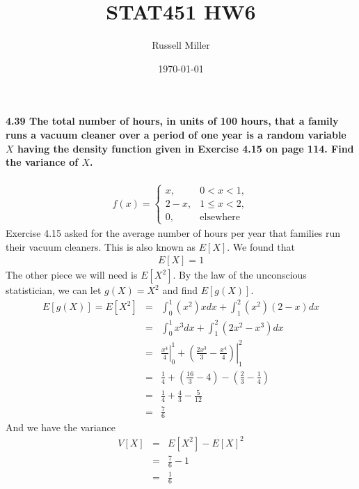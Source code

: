 \documentclass{article}
\title{STAT451 HW6}
\author{Russell Miller}
\date{\today}
\begin{document}
\maketitle


\paragraph{4.39 The total number of hours, in units of 100 hours, that a family 
runs a vacuum cleaner over a period of one year is a random variable $X$ having 
the density function given in Exercise 4.15 on page 114. Find the variance of 
$X$.}
\begin{eqnarray*}
f(x) = \left\{\begin{array}{ll}
	x,& 0<x<1,\\
	2-x,& 1\leq x<2,\\
	0,& \mbox{elsewhere}
	\end{array}\right.
\end{eqnarray*}
Exercise 4.15 asked for the average number of hours per year that families run 
their vacuum cleaners. This is also known as $E[X]$. We found that
\begin{eqnarray*}
E[X] = 1
\end{eqnarray*}
The other piece we will need is $E[X^2]$. By the law of the unconscious 
statistician, we can let $g(X)=X^2$ and find $E[g(X)]$.
\begin{eqnarray*}
E[g(X)]=E[X^2] & = & \int_0^1 (x^2)xdx + \int_1^2 (x^2)(2-x)dx\\
	& = & \int_0^1 x^3dx + \int_1^2 (2x^2-x^3)dx\\
	& = & \left.\frac{x^4}{4}\right|_0^1 + \left.\left(\frac{2x^3}{3}-
				\frac{x^4}{4}\right)\right|_1^2\\
	& = & \frac{1}{4}+\left(\frac{16}{3}-4\right)-
				\left(\frac{2}{3}-\frac{1}{4}\right)\\
	& = & \frac{1}{4}+\frac{4}{3}-\frac{5}{12}\\
	& = & \frac{7}{6}
\end{eqnarray*}
And we have the variance
\begin{eqnarray*}
V[X] & = & E[X^2]-E[X]^2\\
	& = & \frac{7}{6}-1\\
	& = & \boxed{\frac{1}{6}}
\end{eqnarray*}

\pagebreak
\end{document}
